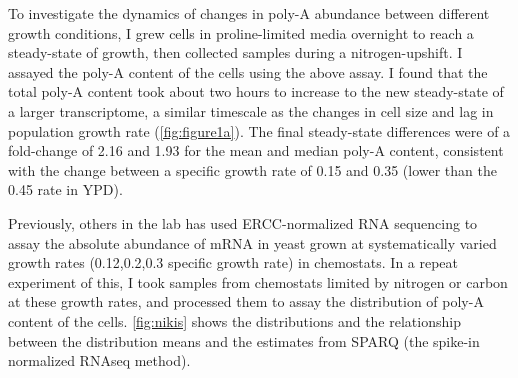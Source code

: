 
To investigate the dynamics of changes in poly-A abundance between 
different growth conditions, I grew cells in proline-limited media
overnight to reach a steady-state of growth, then collected samples
during a nitrogen-upshift.
I assayed the poly-A content of the cells using the above assay.
I found that the total poly-A content took about two hours to increase
to the new steady-state of a larger transcriptome, a similar timescale
as the changes in cell size and lag in population growth rate
(\autoref{fig:figure1a}).
The final steady-state differences were of a fold-change of 2.16 and
1.93 for the mean and median poly-A content, consistent with the
change between a specific growth rate of 0.15 and 0.35 (lower than the
0.45 rate in YPD). 


Previously, others in the lab has used ERCC-normalized RNA sequencing
to assay the absolute abundance of mRNA in yeast grown at
systematically varied growth rates (0.12,0.2,0.3 specific growth rate)
in chemostats. In a repeat experiment of this, I took samples from
chemostats limited by nitrogen or carbon at these growth rates, and
processed them to assay the distribution of poly-A content of the 
cells. \autoref{fig:nikis} shows the distributions and the
relationship between the distribution means and the estimates from
SPARQ (the spike-in normalized RNAseq method).


